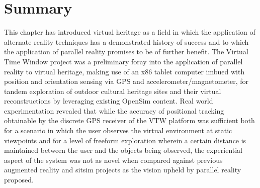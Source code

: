 
\section{Summary}

This chapter has introduced virtual heritage as a field in which the application of alternate reality techniques has a demonstrated history of success and to which the application of parallel reality promises to be of further benefit. The Virtual Time Window project was a preliminary foray into the application of parallel reality to virtual heritage, making use of an x86 tablet computer imbued with position and orientation sensing via GPS and accelerometer/magnetometer, for tandem exploration of outdoor cultural heritage sites and their virtual reconstructions by leveraging existing OpenSim content. Real world experimentation revealed that while the accuracy of positional tracking obtainable by the discrete GPS receiver of the VTW platform was sufficient both for a scenario in which the user observes the virtual environment at static viewpoints and for a level of freeform exploration wherein a certain distance is maintained between the user and the objects being observed, the experiential aspect of the system was not as novel when compared against previous augmented reality and sitsim projects as the vision upheld by parallel reality proposed.

